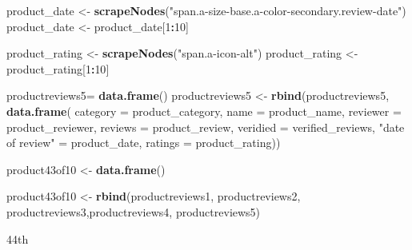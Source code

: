 \documentclass[
]{article}
\newenvironment{Shaded}{\begin{snugshade}}{\end{snugshade}}
\newcommand{\AttributeTok}[1]{\textcolor[rgb]{0.13,0.29,0.53}{#1}}
\newcommand{\DecValTok}[1]{\textcolor[rgb]{0.00,0.00,0.81}{#1}}
\newcommand{\FunctionTok}[1]{\textcolor[rgb]{0.13,0.29,0.53}{\textbf{#1}}}
\newcommand{\NormalTok}[1]{#1}
\newcommand{\OtherTok}[1]{\textcolor[rgb]{0.56,0.35,0.01}{#1}}
\newcommand{\SpecialCharTok}[1]{\textcolor[rgb]{0.81,0.36,0.00}{\textbf{#1}}}
\newcommand{\StringTok}[1]{\textcolor[rgb]{0.31,0.60,0.02}{#1}}
\begin{document}
\begin{Shaded}
\begin{Highlighting}[]
\NormalTok{  product\_date }\OtherTok{\textless{}{-}} \FunctionTok{scrapeNodes}\NormalTok{(}\StringTok{"span.a{-}size{-}base.a{-}color{-}secondary.review{-}date"}\NormalTok{)}
\NormalTok{  product\_date }\OtherTok{\textless{}{-}}\NormalTok{ product\_date[}\DecValTok{1}\SpecialCharTok{:}\DecValTok{10}\NormalTok{]}
  
\NormalTok{  product\_rating }\OtherTok{\textless{}{-}} \FunctionTok{scrapeNodes}\NormalTok{(}\StringTok{"span.a{-}icon{-}alt"}\NormalTok{)}
\NormalTok{  product\_rating }\OtherTok{\textless{}{-}}\NormalTok{ product\_rating[}\DecValTok{1}\SpecialCharTok{:}\DecValTok{10}\NormalTok{]}
  
\NormalTok{  productreviews5}\OtherTok{=} \FunctionTok{data.frame}\NormalTok{()}
\NormalTok{  productreviews5 }\OtherTok{\textless{}{-}} \FunctionTok{rbind}\NormalTok{(productreviews5, }\FunctionTok{data.frame}\NormalTok{(}
                      \AttributeTok{category =}\NormalTok{ product\_category,}
                      \AttributeTok{name =}\NormalTok{ product\_name,}
                      \AttributeTok{reviewer =}\NormalTok{ product\_reviewer,}
                      \AttributeTok{reviews =}\NormalTok{ product\_review,}
                      \AttributeTok{veridied =}\NormalTok{ verified\_reviews,}
                      \StringTok{"date of review"} \OtherTok{=}\NormalTok{ product\_date,}
                      \AttributeTok{ratings =}\NormalTok{ product\_rating))}
  
\NormalTok{  product43of10 }\OtherTok{\textless{}{-}} \FunctionTok{data.frame}\NormalTok{()}
  
\NormalTok{  product43of10 }\OtherTok{\textless{}{-}} \FunctionTok{rbind}\NormalTok{(productreviews1, productreviews2, productreviews3,productreviews4, productreviews5)}
\end{Highlighting}
\end{Shaded}

44th
\end{document}
